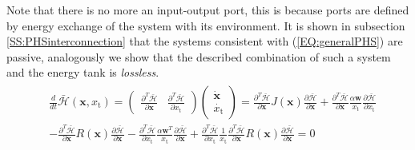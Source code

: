\documentclass[a4paper,twoside, openright,12pt]{report}
\newcommand{\f}[1]{\boldsymbol{#1}}
\newcommand{\g}[1]{\text{#1}}
\begin{document}
{Note that there is no more an input-output port, this is because ports are defined by energy exchange of the system with its environment. It is shown in subsection \ref{SS:PHSinterconnection} that the systems consistent with (\ref{EQ:generalPHS}) are passive, analogously we show that the described combination of such a system and the energy tank is \emph{lossless}.
\begin{eqnarray}
\begin{aligned}
&\frac{d}{dt}\bar{\mathcal{H}}(\f{x},x_\g{t}) = 
\begin{pmatrix}
\frac{\partial^T \bar{\mathcal{H}}}{\partial \f{x}} & \frac{\partial^T \bar{\mathcal{H}}}{\partial x_\g{t}}
\end{pmatrix}
\begin{pmatrix}
\dot{\f{x}} \\ \dot{x_\g{t}}
\end{pmatrix}
= \frac{\partial^T \bar{\mathcal{H}}}{\partial \f{x}}J(\f{x})\frac{\partial \bar{\mathcal{H}}}{\partial \f{x}} + \frac{\partial^T \bar{\mathcal{H}}}{\partial \f{x}}\frac{\alpha \f{w}}{x_\g{t}}\frac{\partial \bar{\mathcal{H}}}{\partial x_\g{t}} 
\\
&- \frac{\partial^T \bar{\mathcal{H}}}{\partial \f{x}}R(\f{x})\frac{\partial \bar{\mathcal{H}}}{\partial \f{x}} -\frac{\partial^T \bar{\mathcal{H}}}{\partial x_\g{t}}\frac{\alpha \f{w}^T}{x_\g{t}} \frac{\partial \bar{\mathcal{H}}}{\partial \f{x}} + \frac{\partial^T \bar{\mathcal{H}}}{\partial x_\g{t}}\frac{1}{x_\g{t}}\frac{\partial^T \bar{\mathcal{H}}}{\partial \f{x}}R(\f{x})\frac{\partial \bar{\mathcal{H}}}{\partial \f{x}} = 0
\end{aligned}
\end{eqnarray}

 
}
\end{document}
